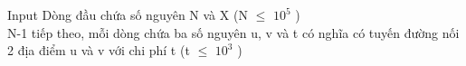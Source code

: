 Input
Dòng đầu chứa số nguyên N và X (N  $\le$  $10^{5}$ )
\\N-1 tiếp theo, mỗi dòng chứa ba số nguyên u, v và t có nghĩa có tuyến đường nối 2 địa điểm u và v với chi phí t (t  $\le$  $10^{3}$ )
\\ 